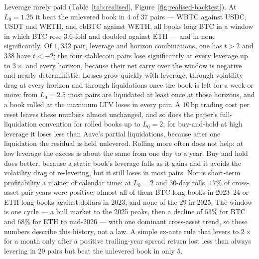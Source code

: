 \documentclass[11pt]{article}
\theoremstyle{plain}
\theoremstyle{definition}
\theoremstyle{remark}
\begin{document}
Leverage rarely paid (Table~\ref{tab:realised}, Figure~\ref{fig:realised-backtest}). At $L_0=1.25$
it beat the unlevered book in $4$ of $37$ pairs --- WBTC against USDC, USDT and WETH, and cbBTC against
WETH, all books long BTC in a window in which BTC rose $3.6$-fold and doubled against ETH --- and
in none significantly. Of $1{,}332$ pair, leverage and horizon combinations, one has $t>2$ and $338$
have $t<-2$; the four stablecoin pairs lose significantly at every leverage up to $3\times$ and every
horizon, because their net carry over the window is negative and nearly deterministic. Losses grow quickly with
leverage, through volatility drag at every horizon and through liquidations once the book is left
for a week or more: from $L_0=2.5$ most pairs are liquidated at least once at those horizons, and a
book rolled at the maximum LTV loses in every pair. A $10$\,bp trading cost per reset leaves these
numbers almost unchanged, and so does the paper's full-liquidation convention for rolled books up to
$L_0=2$; for buy-and-hold at high leverage it loses less than Aave's partial liquidations, because
after one liquidation the residual is held unlevered. Rolling more often does not help: at low leverage the excess is about the same from one
day to a year. Buy and hold does better, because a static book's leverage falls as it gains and it
avoids the volatility drag of re-levering, but it still loses in most pairs. Nor is short-term profitability a matter
of calendar time: at $L_0=2$ and $30$-day rolls, $17\%$ of cross-asset pair-years were positive, almost
all of them BTC-long books in 2023--24 or ETH-long books against dollars in 2023, and none of the $29$
in 2025. The window is one cycle --- a bull market
to the 2025 peaks, then a decline of $53\%$ for BTC and $68\%$ for ETH to mid-2026 --- with one
dominant cross-asset trend, so these numbers describe this history, not a law. A simple ex-ante rule
that levers to $2\times$ for a month only after a positive trailing-year spread return lost less than
always levering in $29$ pairs but beat the unlevered book in only $5$.
\end{document}
